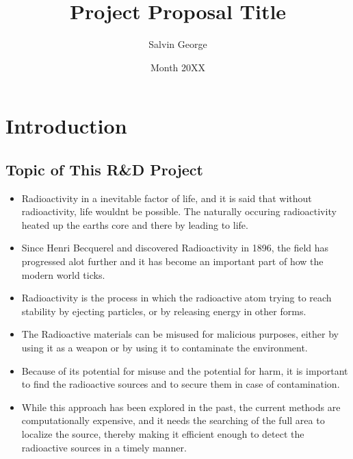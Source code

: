 \documentclass[rnd]{mas_proposal}
\title{Project Proposal Title}
\author{Salvin George}
\date{Month 20XX}
\begin{document}
\maketitle

\pagestyle{plain}

\section{Introduction}

\subsection{Topic of This R\&D Project}
\begin{itemize}
    \item Radioactivity in a inevitable factor of life, and it is said that without radioactivity, life wouldnt be possible. The naturally occuring radioactivity heated up the earths core and there by leading to life.\cite{DOEExplainsRadioactivity}
    \item Since Henri Becquerel and discovered Radioactivity in 1896, the field has progressed alot further and it has become an important part of how the modern world ticks.
    \item Radioactivity is the process in which the radioactive atom trying to reach stability by ejecting particles, or by releasing energy in other forms.
    \item The Radioactive materials can be misused for malicious purposes, either by using it as a weapon or by using it to contaminate the environment.
    \item Because of its potential for misuse and the potential for harm, it is important to find the radioactive sources and to secure them in case of contamination. 
    \item While this approach has been explored in the past, the current methods are computationally expensive, and it needs the searching of the full area to localize the source, thereby making it efficient enough to detect the radioactive sources in a timely manner.

\end{itemize}
\end{document}
